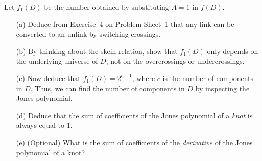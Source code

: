 \documentclass[a4paper]{amsart}
\begin{document}
\begin{exercise}
 Let $f_1(D)$ be the number obtained by substituting $A=1$
 in $f(D)$.
 \begin{itemize}
  \item[(a)] Deduce from Exercise~4 on Problem Sheet~1 that any link
   can be converted to an unlink by switching crossings.
  \item[(b)] By thinking about the skein relation, show that $f_1(D)$ only
   depends on the underlying universe of $D$, not on the overcrossings
   or undercrossings.  
  \item[(c)] Now deduce that $f_1(D)=2^{c-1}$, where $c$ is the number of
   components in $D$.  Thus, we can find the number of components in
   $D$ by inspecting the Jones polynomial. 
  \item[(d)] Deduce that the sum of coefficients of the Jones polynomial
   of a \emph{knot} is always equal to 1.
  \item[(e)] (Optional) What is the sum of coefficients of the
   \emph{derivative} of the Jones polynomial of a knot?
 \end{itemize} 
\end{exercise}
\end{document}
